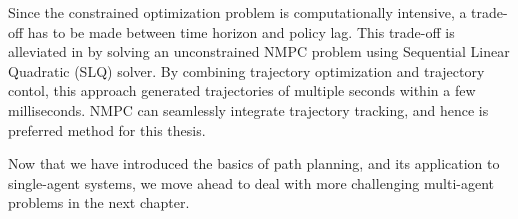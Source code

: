 Since the constrained optimization problem is computationally intensive, a trade-off has to be made between time horizon and policy lag. This trade-off is alleviated in \cite{neunert2016fast} by solving an unconstrained NMPC problem using Sequential Linear Quadratic (SLQ) solver. By combining trajectory optimization and trajectory contol, this approach generated trajectories of multiple seconds within a few milliseconds. NMPC can seamlessly integrate trajectory tracking, and hence is preferred method for this thesis.

Now that we have introduced the basics of path planning, and its application to single-agent systems, we move ahead to deal with more challenging multi-agent problems in the next chapter. 




